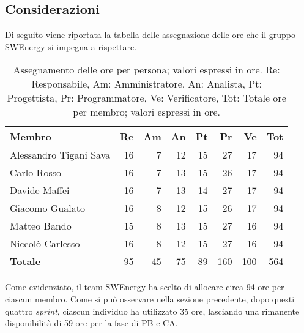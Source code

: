 \subsection{Considerazioni}
Di seguito viene riportata la tabella delle assegnazione delle ore che il gruppo SWEnergy si impegna a rispettare.

\begin{table}[H]
	\centering
	\begin{tabular}{l|r|r|r|r|r|r|r}
		\textbf{Membro}        & \textbf{Re} & \textbf{Am} & \textbf{An}  & \textbf{Pt}
		                       & \textbf{Pr} & \textbf{Ve} & \textbf{Tot}                                 \\
		\hline
		Alessandro Tigani Sava & 16          & 7           & 12           & 15          & 27  & 17  & 94  \\
		Carlo Rosso            & 16          & 7           & 13           & 15          & 26  & 17  & 94  \\
		Davide Maffei          & 16          & 7           & 13           & 14          & 27  & 17  & 94  \\
		Giacomo Gualato        & 16          & 8           & 12           & 15          & 26  & 17  & 94  \\
		Matteo Bando           & 15          & 8           & 13           & 15          & 27  & 16  & 94  \\
		Niccolò Carlesso       & 16          & 8           & 12           & 15          & 27  & 16  & 94  \\
		\hline
		\textbf{Totale}        & 95          & 45          & 75           & 89          & 160 & 100 & 564 \\
	\end{tabular}

	\caption{Assegnamento delle ore per persona; valori espressi in ore.
		Re: Responsabile, Am: Amministratore, An: Analista, Pt:
		Progettista, Pr: Programmatore, Ve: Verificatore, Tot: Totale ore per
		membro; valori espressi in ore.}
\end{table}

Come evidenziato, il team SWEnergy ha scelto di allocare circa 94 ore per ciascun membro. Come si può osservare nella sezione precedente, dopo questi quattro \textit{sprint}, ciascun
individuo ha utilizzato 35 ore, lasciando una rimanente disponibilità di 59 ore per la fase di PB e CA.



